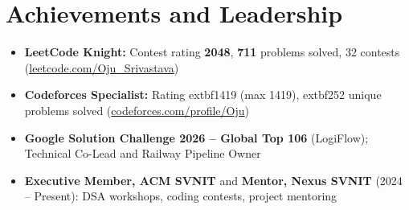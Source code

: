 \documentclass[a4paper,10pt]{article}
\begin{document}
\section{Achievements and Leadership}
\small
\begin{itemize}
  \item \textbf{LeetCode Knight:} Contest rating \textbf{2048}, \textbf{711} problems solved, 32 contests (\href{https://leetcode.com/Oju_Srivastava}{leetcode.com/Oju\_Srivastava})
  \item \textbf{Codeforces Specialist:} Rating 	extbf{1419} (max 1419), 	extbf{252} unique problems solved (\href{https://codeforces.com/profile/Oju}{codeforces.com/profile/Oju})
  \item \textbf{Google Solution Challenge 2026 -- Global Top 106} (LogiFlow); Technical Co-Lead and Railway Pipeline Owner
  \item \textbf{Executive Member, ACM SVNIT} and \textbf{Mentor, Nexus SVNIT} (2024 -- Present): DSA workshops, coding contests, project mentoring
\end{itemize}
\end{document}
